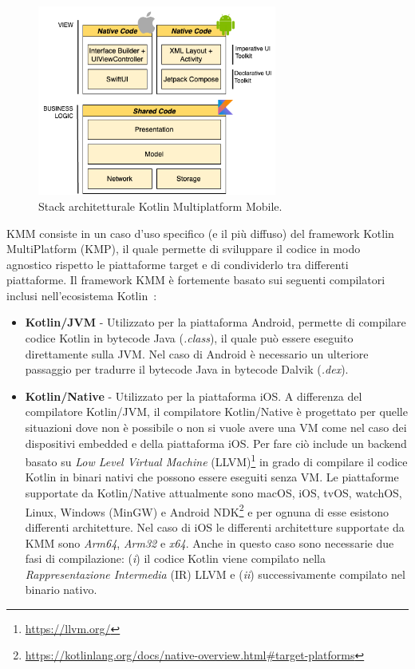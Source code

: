 \begin{figure}[H]
    \centering
    \includegraphics[width=0.7\textwidth]{img/stack_kmm.png}
    \caption{Stack architetturale Kotlin Multiplatform Mobile.}
    \label{stackKMM}
\end{figure}

KMM consiste in un caso d'uso specifico (e il più diffuso) del framework Kotlin MultiPlatform (KMP), il quale permette di sviluppare il codice in modo agnostico rispetto le piattaforme target e di condividerlo tra differenti piattaforme. Il framework KMM è fortemente basato sui seguenti compilatori inclusi nell'ecosistema Kotlin~\cite{nagy2022simplifying}:

\begin{itemize}
    \item \textbf{Kotlin/JVM} - Utilizzato per la piattaforma Android, permette di compilare codice Kotlin in bytecode Java (\textit{.class}), il quale può essere eseguito direttamente sulla JVM. Nel caso di Android è necessario un ulteriore passaggio per tradurre il bytecode Java in bytecode Dalvik (\textit{.dex}).

    \item \textbf{Kotlin/Native} - Utilizzato per la piattaforma iOS. A differenza del compilatore Kotlin/JVM, il compilatore Kotlin/Native è progettato per quelle situazioni dove non è possibile o non si vuole avere una VM come nel caso dei dispositivi embedded e della piattaforma iOS. Per fare ciò include un backend basato su \textit{Low Level Virtual Machine} (LLVM)\footnote{\href{https://llvm.org/}{https://llvm.org/}} in grado di compilare il codice Kotlin in binari nativi che possono essere eseguiti senza VM\cite{nagy2022simplifying}. Le piattaforme supportate da Kotlin/Native attualmente sono macOS, iOS, tvOS, watchOS, Linux, Windows (MinGW) e Android NDK\footnote{\href{https://kotlinlang.org/docs/native-overview.html\#target-platforms}{https://kotlinlang.org/docs/native-overview.html\#target-platforms}} e per ognuna di esse esistono differenti architetture. Nel caso di iOS le differenti architetture supportate da KMM sono \textit{Arm64}, \textit{Arm32} e \textit{x64}. Anche in questo caso sono necessarie due fasi di compilazione: (\textit{i}) il codice Kotlin viene compilato nella \textit{Rappresentazione Intermedia} (IR) LLVM e (\textit{ii}) successivamente compilato nel binario nativo.
\end{itemize}

